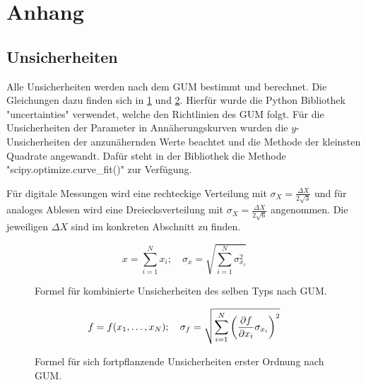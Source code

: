 \newpage
\appendix
\section{Anhang}\label{sec:anhang}

\subsection{Unsicherheiten}\label{sec:unsicherheiten}

Alle Unsicherheiten werden nach dem GUM bestimmt und berechnet.
Die Gleichungen dazu finden sich in \ref{fig:GUM_combine} und \ref{fig:GUM_formula}.
Hierfür wurde die Python Bibliothek "uncertainties" verwendet, welche den Richtlinien des GUM folgt.
Für die Unsicherheiten der Parameter in Annäherungskurven wurden die $y$-Unsicherheiten der anzunähernden Werte beachtet und die Methode der kleinsten Quadrate angewandt.
Dafür steht in der Bibliothek die Methode "scipy.optimize.curve\_fit()" zur Verfügung.

Für digitale Messungen wird eine rechteckige Verteilung mit $\sigma_X = \frac{\Delta X}{2\sqrt{3}}$ und für analoges Ablesen wird eine Dreiecksverteilung mit $\sigma_X = \frac{\Delta X}{2\sqrt{6}}$ angenommen.
Die jeweiligen $\Delta X$ sind im konkreten Abschnitt zu finden.

\begin{figure}[ht]
	\begin{equation*}
	x = \sum_{i=1}^{N} x_i
	;\quad
	\sigma_x = \sqrt{\sum_{i = 1}^{N} \sigma_{x_i}^2}
	\end{equation*}
	\caption{Formel für kombinierte Unsicherheiten des selben Typs nach GUM.}
	\label{fig:GUM_combine}
\end{figure}

\begin{figure}[ht]
	\begin{align*}
	f = f(x_1, \dots , x_N)
	;\quad
	\sigma_f = \sqrt{\sum_{i = 1}^{N}\left(\pdv{f}{x_i} \sigma_{x_i}\right) ^2}
	\end{align*}
	\caption{Formel für sich fortpflanzende Unsicherheiten erster Ordnung nach GUM.}
	\label{fig:GUM_formula}
\end{figure}
